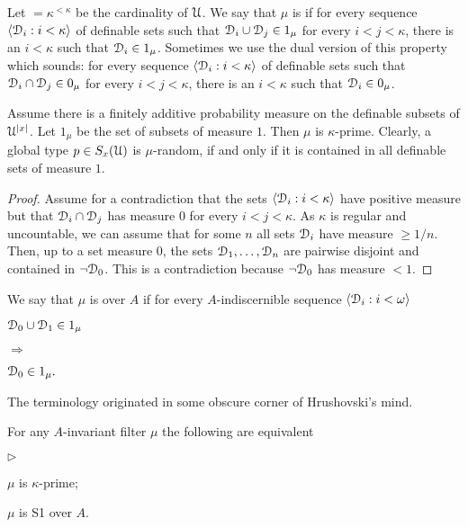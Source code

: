 \documentclass{amsproc}
\newcommand{\mylabel}[1]{{#1}\hfill}
\renewenvironment{itemize}
  {\begin{list}{$\triangleright$}{%
  \setlength{\parskip}{0mm}
  \setlength{\topsep}{.4\baselineskip}
  \setlength{\rightmargin}{0mm}
  \setlength{\listparindent}{0mm}
  \setlength{\itemindent}{0mm}
  \setlength{\labelwidth}{3ex}
  \setlength{\itemsep}{.2\baselineskip}
  \setlength{\parsep}{.2\baselineskip}
  \setlength{\partopsep}{0mm}
  \setlength{\labelsep}{1ex}
  \setlength{\leftmargin}{\labelwidth+\labelsep}
  \let\makelabel\mylabel}}{%
\end{list}}
\renewcommand*{\emph}[1]{%
   \smash{\tikz[baseline]\node[rectangle, fill=teal!25, rounded corners, inner xsep=0.5ex, inner ysep=0.2ex, anchor=base, minimum height = 2.7ex]{\strut #1};}}
\begin{document}
Let \emph{$\kappa$}$=\kappa^{<\kappa}$ be the cardinality of $\EuScript U$.
We say that $\mu$ is \emph{$\kappa$-prime} if for every sequence $\langle\EuScript D_i:i<\kappa\rangle$ of definable sets such that $\EuScript D_i\cup \EuScript D_j\in1_\mu$ for every $i<j<\kappa$, there is an $i<\kappa$ such that $\EuScript D_i\in1_\mu$.
Sometimes we use the dual version of this property which sounds: for every sequence $\langle\EuScript D_i:i<\kappa\rangle$ of definable sets such that $\EuScript D_i\cap \EuScript D_j\in0_\mu$ for every $i<j<\kappa$, there is an $i<\kappa$ such that $\EuScript D_i\in0_\mu$.

\begin{example}
  Assume there is a finitely additive probability measure on the definable subsets of $\EuScript U^{|x|}$.
  Let $1_\mu$ be the set of subsets of measure $1$.
  Then $\mu$ is $\kappa$-prime. 
  Clearly, a global type $p\in S_x(\EuScript U)$ is $\mu$-random, if and only if it is contained in all definable sets of measure $1$.
\end{example}

\begin{proof}
  Assume for a contradiction that the sets $\langle\EuScript D_i:i<\kappa\rangle$ have positive measure but that $\EuScript D_i\cap \EuScript D_j$ has measure $0$ for every $i<j<\kappa$.
  As $\kappa$ is regular and uncountable, we can assume that for some $n$ all sets $\EuScript D_i$ have measure $\ge 1/n$.
  Then, up to a set measure $0$, the sets $\EuScript D_1,\dots,\EuScript D_n$ are pairwise disjoint and contained in $\neg\EuScript D_0$.
  This is a contradiction because $\neg\EuScript D_0$ has measure $<1$.
\end{proof}

We say that $\mu$ is \emph{S1\/} over $A$ if for every $A$-indiscernible sequence $\langle\EuScript D_i:i<\omega\rangle$
    
\def\ceq#1#2#3{\parbox[t]{25ex}{$\displaystyle #1$}\parbox{6ex}{\hfil $#2$}{$\displaystyle #3$}}

\ceq{\hfill\EuScript D_0\cup\EuScript D_1\in1_\mu}{\Rightarrow}{\EuScript D_0\in1_\mu.}

The terminology originated in some obscure corner of Hrushovski's mind.

\begin{fact}
  For any $A$-invariant filter $\mu$ the following are equivalent
  \begin{itemize}
    \item[1.] $\mu$ is $\kappa$-prime;
    \item[2.] $\mu$ is S1 over $A$.
  \end{itemize}
\end{fact}
\end{document}
